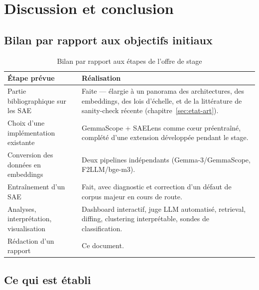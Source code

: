 \documentclass[11pt]{article}
\begin{document}
\section{Discussion et conclusion}
\label{sec:discussion}

\subsection{Bilan par rapport aux objectifs initiaux}

\begin{table}[h!]
\centering
\caption{Bilan par rapport aux étapes de l'offre de stage}
\vspace{0.4em}\small
\begin{tabular}{@{}p{5.5cm}p{8.5cm}@{}}
\toprule
\textbf{Étape prévue} & \textbf{Réalisation} \\ \midrule
Partie bibliographique sur les SAE & Faite --- élargie à un panorama des
  architectures, des embeddings, des lois d'échelle, et de la littérature de
  sanity-check récente (chapitre~\ref{sec:etat-art}). \\
Choix d'une implémentation existante & GemmaScope + SAELens comme cœur
  préentraîné, complété d'une extension développée pendant le stage. \\
Conversion des données en embeddings & Deux pipelines indépendants
  (Gemma-3/GemmaScope, F2LLM/bge-m3). \\
Entraînement d'un SAE & Fait, avec diagnostic et correction d'un défaut de
  corpus majeur en cours de route. \\
Analyses, interprétation, visualisation & Dashboard interactif, juge LLM
  automatisé, retrieval, diffing, clustering interprétable, sondes de
  classification. \\
Rédaction d'un rapport & Ce document. \\
\bottomrule
\end{tabular}
\end{table}

\subsection{Ce qui est établi}
\end{document}
